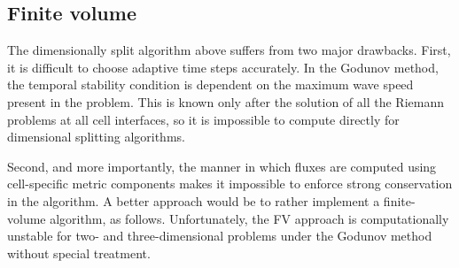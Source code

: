 \subsection{Finite volume}
The dimensionally split algorithm above suffers from two major drawbacks. First, it is difficult to choose adaptive time steps accurately. In the Godunov method, the temporal stability condition is dependent on the maximum wave speed present in the problem. This is known only after the solution of all the Riemann problems at all cell interfaces, so it is impossible to compute directly for dimensional splitting algorithms.

Second, and more importantly, the manner in which fluxes are computed using cell-specific metric components makes it impossible to enforce strong conservation in the algorithm. A better approach would be to rather implement a finite-volume algorithm, as follows. Unfortunately, the FV approach is computationally unstable for two- and three-dimensional problems under the Godunov method without special treatment.
